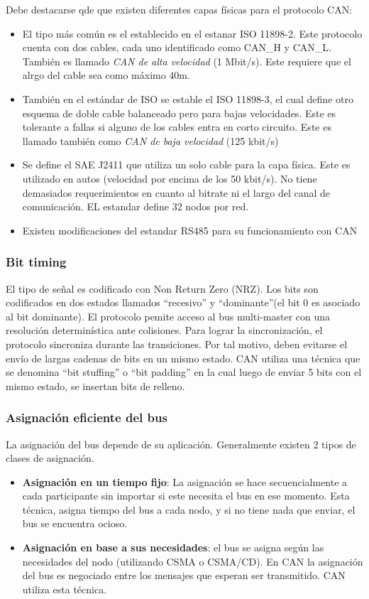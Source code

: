 Debe destacarse qde que existen diferentes capas físicas para el protocolo CAN:
\begin{itemize}
\item El tipo más común es el establecido en el estanar ISO 11898-2. Este protocolo cuenta con dos cables, cada uno identificado como CAN\_H y CAN\_L. También es llamado \textit{CAN de alta velocidad} (1 Mbit/s). Este requiere que el alrgo del cable sea como máximo 40m.
\item También en el estándar de ISO se estable el ISO 11898-3, el cual define otro esquema de doble cable balanceado pero para bajas velocidades. Este es tolerante a fallas si alguno de los cables entra en corto circuito. Este es llamado también como \textit{CAN de baja velocidad} (125 kbit/s)
\item Se define el SAE J2411 que utiliza un solo cable para la capa física. Este es utilizado en autos (velocidad por encima de los 50 kbit/s). No tiene demasiados requerimientos en cuanto al bitrate ni el largo del canal de comunicación. EL estandar define 32 nodos por red.
\item Existen modificaciones del estandar RS485 para su funcionamiento con CAN
\end{itemize}

\subsubsection{Bit timing}
El tipo de señal es codificado con Non Return Zero (NRZ). Los bits son codificados en dos estados llamados ``recesivo'' y ``dominante''(el bit 0 es asociado al bit dominante). El protocolo pemite acceso al bus multi-master con una resolución determinística ante colisiones. Para lograr la sincronización, el protocolo sincroniza durante las transiciones. Por tal motivo, deben evitarse el envío de largas cadenas de bits en un mismo estado. CAN utiliza una técnica que se denomina ``bit stuffing'' o ``bit padding'' en la cual luego de enviar 5 bits con el mismo estado, se insertan bits de relleno.

\subsubsection{Asignación eficiente del bus}
La asignación del bus depende de su aplicación. Generalmente existen 2 tipos de clases de asignación.

\begin{itemize}
\item \textbf{Asignación en un tiempo fijo}: La asignación se hace secuencialmente a cada participante sin importar si este necesita el bus en ese momento. Esta técnica, asigna tiempo del bus a cada nodo, y si no tiene nada que enviar, el bus se encuentra ocioso.

\item \textbf{Asignación en base a sus necesidades}: el bus se asigna según las necesidades del nodo (utilizando CSMA o CSMA/CD). En CAN la asignación del bus es negociado entre los mensajes que esperan ser transmitido. CAN utiliza esta técnica.
\end{itemize}
